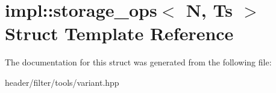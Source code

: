 \hypertarget{structimpl_1_1storage__ops}{}\section{impl\+:\+:storage\+\_\+ops$<$ N, Ts $>$ Struct Template Reference}
\label{structimpl_1_1storage__ops}


The documentation for this struct was generated from the following file\+:\begin{DoxyCompactItemize}
\item 
header/filter/tools/variant.\+hpp\end{DoxyCompactItemize}
